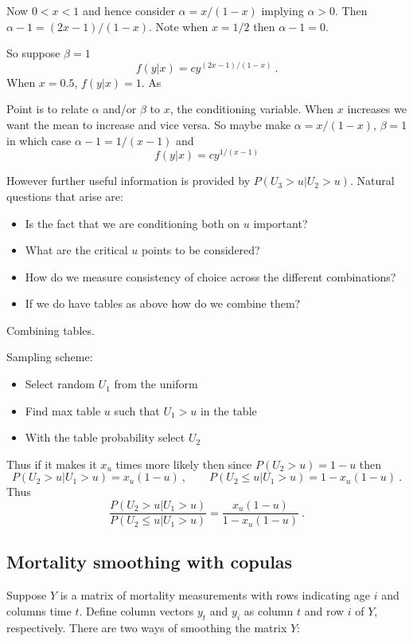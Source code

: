 \documentclass[a4paper,12pt]{article}
\begin{document}
Now $0<x<1$ and hence consider $\alpha=x/(1-x)$ implying $\alpha>0$.   Then $\alpha-1=(2x-1)/(1-x)$.  Note when $x=1/2$ then $\alpha-1=0$.




So suppose $\beta=1$
$$
f(y|x)= cy^{(2x-1)/(1-x)}\ .
$$
When $x=0.5$, $f(y|x)=1$.  As



Point is to relate $\alpha$ and/or $\beta$ to $x$, the conditioning variable.  When $x$ increases we want the mean to increase and vice versa.  So maybe make $\alpha=x/(1-x)$, $\beta=1$ in which case $\alpha-1=1/(x-1)$ and
$$
f(y|x)=cy^{1/(x-1)}
$$

  However further useful information is provided by $P(U_3>u|U_2>u)$. Natural questions that arise are:
\begin{itemize}
    \item Is the fact that we are conditioning both on $u$ important?
    \item What are the critical $u$ points to be considered?
    \item How do we measure consistency of choice across the different combinations?
    \item If we do have tables as above how do we combine them?
\end{itemize}

Combining tables.

Sampling scheme:
\begin{itemize}
    \item Select random $U_1$ from the uniform
    \item Find max table $u$ such that $U_1>u$ in the table
    \item With the table probability select $U_2$
\end{itemize}

Thus if it makes it $x_u$ times more likely then since $P(U_2>u)=1-u$ then
$$
P(U_2> u|U_1> u) = x_u(1-u)\ , \qquad P(U_2\le u|U_1> u) = 1-x_u(1-u)\ .
$$
Thus
$$
\frac{P(U_2> u|U_1> u)}{P(U_2\le u|U_1> u)}=\frac{x_u(1-u)}{1-x_u(1-u)}\ .
$$

\subsection*{Mortality smoothing with copulas}

Suppose $Y$ is a matrix of mortality measurements with rows indicating age $i$ and columns time $t$.   Define column vectors $y_t$ and $y_i$ as column $t$ and row $i$ of  $Y$, respectively.  There are two ways of smoothing the matrix $Y$:
\end{document}
